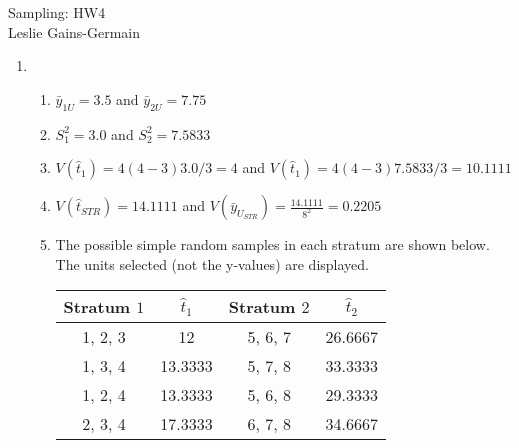 \documentclass[12pt]{article}\usepackage[]{graphicx}\usepackage[]{color}
\begin{document}
  
  
\begin{center}
\large{Sampling: HW4} \\
Leslie Gains-Germain
\end{center}

\begin{doublespacing}

\begin{enumerate}

\item \begin{enumerate}

\item $\bar{y}_{1U} = 3.5$ and $\bar{y}_{2U} = 7.75$



\item $S_1^2 = 3.0$ and $S_2^2 = 7.5833$

\item $V(\hat{t}_1) = 4(4-3)3.0/3 = 4$ and $V(\hat{t}_1) = 4(4-3)7.5833/3 = 10.1111$

\item $V(\hat{t}_{STR}) = 14.1111$ and $V(\bar{y}_{U_{STR}}) = \frac{14.1111}{8^2} = 0.2205$ 

\item The possible simple random samples in each stratum are shown below. The units selected (not the y-values) are displayed.
\begin{table}[H]
\centering
\begin{tabular}{c|c|c|c}
Stratum $1$ &  $\hat{t}_1$ & Stratum $2$ & $\hat{t}_2$ \\
\hline
{1, 2, 3} & 12 & {5, 6, 7} & 26.6667 \\
{1, 3, 4} & 13.3333 & {5, 7, 8} & 33.3333 \\
{1, 2, 4} & 13.3333 & {5, 6, 8} & 29.3333 \\
{2, 3, 4} & 17.3333 & {6, 7, 8} & 34.6667 \\
\hline
\end{tabular}
\end{table}


\end{enumerate}
\end{enumerate}
\end{doublespacing}
\end{document}
